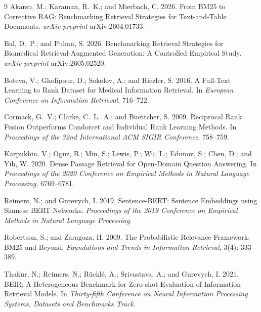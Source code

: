 \documentclass[10pt,letterpaper,twocolumn]{article}
\begin{document}
\begin{thebibliography}{9}
Akarsu, M.; Karaman, R.~K.; and Mierbach, C. 2026.
From BM25 to Corrective RAG: Benchmarking Retrieval Strategies for Text-and-Table Documents.
\emph{arXiv preprint} arXiv:2604.01733.

Bal, D.~P.; and Puhan, S. 2026.
Benchmarking Retrieval Strategies for Biomedical Retrieval-Augmented Generation: A Controlled Empirical Study.
\emph{arXiv preprint} arXiv:2605.02520.

Boteva, V.; Gholipour, D.; Sokolov, A.; and Riezler, S. 2016.
A Full-Text Learning to Rank Dataset for Medical Information Retrieval.
In \emph{European Conference on Information Retrieval}, 716--722.

Cormack, G.~V.; Clarke, C.~L.~A.; and Buettcher, S. 2009.
Reciprocal Rank Fusion Outperforms Condorcet and Individual Rank Learning Methods.
In \emph{Proceedings of the 32nd International ACM SIGIR Conference}, 758--759.

Karpukhin, V.; Oguz, B.; Min, S.; Lewis, P.; Wu, L.; Edunov, S.; Chen, D.; and Yih, W. 2020.
Dense Passage Retrieval for Open-Domain Question Answering.
In \emph{Proceedings of the 2020 Conference on Empirical Methods in Natural Language Processing}, 6769--6781.

Reimers, N.; and Gurevych, I. 2019.
Sentence-BERT: Sentence Embeddings using Siamese BERT-Networks.
\emph{Proceedings of the 2019 Conference on Empirical Methods in Natural Language Processing}.

Robertson, S.; and Zaragoza, H. 2009.
The Probabilistic Relevance Framework: BM25 and Beyond.
\emph{Foundations and Trends in Information Retrieval}, 3(4): 333--389.

Thakur, N.; Reimers, N.; R{\"u}ckl{\'e}, A.; Srivastava, A.; and Gurevych, I. 2021.
BEIR: A Heterogeneous Benchmark for Zero-shot Evaluation of Information Retrieval Models.
In \emph{Thirty-fifth Conference on Neural Information Processing Systems, Datasets and Benchmarks Track}.
\end{thebibliography}
\end{document}
